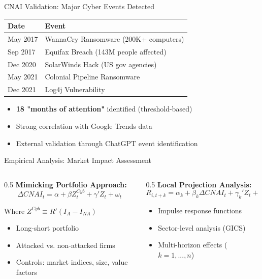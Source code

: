 \documentclass[aspectratio=169]{beamer}
\begin{document}
\begin{frame}{CNAI Validation: Major Cyber Events Detected}
\begin{table}[h]
\centering
\small
\begin{tabular}{ll}
\toprule
\textbf{Date} & \textbf{Event} \\
\midrule
May 2017 & WannaCry Ransomware (200K+ computers) \\
Sep 2017 & Equifax Breach (143M people affected) \\
Dec 2020 & SolarWinds Hack (US gov agencies) \\
May 2021 & Colonial Pipeline Ransomware \\
Dec 2021 & Log4j Vulnerability \\
\bottomrule
\end{tabular}
\end{table}

\vspace{0.3cm}
\begin{itemize}
    \item \textbf{18 "months of attention"} identified (threshold-based)
    \item Strong correlation with Google Trends data
    \item External validation through ChatGPT event identification
\end{itemize}
\end{frame}
%
%
\begin{frame}{Empirical Analysis: Market Impact Assessment}
\begin{columns}
\begin{column}{0.5\textwidth}
\textbf{Mimicking Portfolio Approach:}
$$\Delta CNAI_t = \alpha + \beta Z_t^{Cyb} + \gamma' Z_t + \omega_t$$

Where $Z^{Cyb} \equiv R'(I_A - I_{NA})$
\begin{itemize}
    \item Long-short portfolio
    \item Attacked vs. non-attacked firms
    \item Controls: market indices, size, value factors
\end{itemize}
\end{column}
\begin{column}{0.5\textwidth}
\textbf{Local Projection Analysis:}
$$R_{i,t+k} = \alpha_k + \beta_k \Delta CNAI_t + \gamma_k' Z_t + \epsilon_{t+k}$$

\begin{itemize}
    \item Impulse response functions
    \item Sector-level analysis (GICS)
    \item Multi-horizon effects ($k = 1, ..., n$)
\end{itemize}
\end{column}
\end{columns}
\end{frame}
\end{document}
